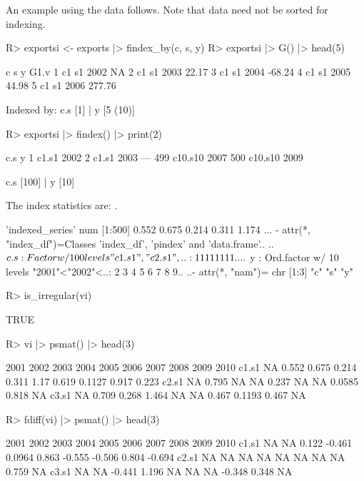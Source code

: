\documentclass[nojss]{jss} %
\newcommand{\class}[1]{`\code{#1}'}
\begin{document}
An example using the  data follows. Note that data need not be sorted for indexing.
\begin{Schunk}
\begin{Sinput}
R> exportsi <- exports |> findex_by(c, s, y)
R> exportsi |> G() |> head(5)
\end{Sinput}
\begin{Soutput}
   c  s    y   G1.v
1 c1 s1 2002     NA
2 c1 s1 2003  22.17
3 c1 s1 2004 -68.24
4 c1 s1 2005  44.98
5 c1 s1 2006 277.76

Indexed by:  c.s [1] | y [5 (10)]
\end{Soutput}
\begin{Sinput}
R> exportsi |> findex() |> print(2)
\end{Sinput}
\begin{Soutput}
    c.s    y
1 c1.s1 2002
2 c1.s1 2003
---
499 c10.s10 2007
500 c10.s10 2009

c.s [100] | y [10]
\end{Soutput}
\end{Schunk}
The index statistics are: . %
\begin{Schunk}
\begin{Soutput}
 'indexed_series' num [1:500] 0.552 0.675 0.214 0.311 1.174 ...
 - attr(*, "index_df")=Classes 'index_df', 'pindex' and 'data.frame'..
  ..$ c.s: Factor w/ 100 levels "c1.s1","c2.s1",..: 1 1 1 1 1 1 1 1 ..
  ..$ y  : Ord.factor w/ 10 levels "2001"<"2002"<..: 2 3 4 5 6 7 8 9..
  ..- attr(*, "nam")= chr [1:3] "c" "s" "y"
\end{Soutput}
\begin{Sinput}
R> is_irregular(vi)
\end{Sinput}
\begin{Soutput}
[1] TRUE
\end{Soutput}
\begin{Sinput}
R> vi |> psmat() |> head(3)
\end{Sinput}
\begin{Soutput}
      2001  2002  2003  2004  2005 2006  2007   2008  2009  2010
c1.s1   NA 0.552 0.675 0.214 0.311 1.17 0.619 0.1127 0.917 0.223
c2.s1   NA 0.795    NA    NA 0.237   NA    NA 0.0585 0.818    NA
c3.s1   NA 0.709 0.268 1.464    NA   NA 0.467 0.1193 0.467    NA
\end{Soutput}
\begin{Sinput}
R> fdiff(vi) |> psmat() |> head(3)
\end{Sinput}
\begin{Soutput}
      2001 2002   2003   2004   2005  2006   2007   2008  2009   2010
c1.s1   NA   NA  0.122 -0.461 0.0964 0.863 -0.555 -0.506 0.804 -0.694
c2.s1   NA   NA     NA     NA     NA    NA     NA     NA 0.759     NA
c3.s1   NA   NA -0.441  1.196     NA    NA     NA -0.348 0.348     NA
\end{Soutput}
\end{Schunk}
\end{document}
